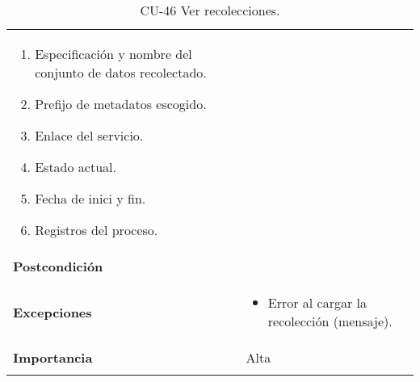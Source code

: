 \begin{longtable}[]{@{}ll@{}}
\begin{minipage}[t]{0.69\columnwidth}
\begin{enumerate}
  \begin{enumerate}
  \def\labelenumii{\alph{enumii}.}
  \tightlist
  \item
    Especificación y nombre del conjunto de datos recolectado.
  \item
    Prefijo de metadatos escogido.
  \item
    Enlace del servicio.
  \item
    Estado actual.
  \item
    Fecha de inici y fin.
  \item
    Registros del proceso.
  \end{enumerate}
\end{enumerate}\strut
\end{minipage}\tabularnewline
\begin{minipage}[t]{0.25\columnwidth}\raggedright
\textbf{Postcondición}\strut
\end{minipage} & \begin{minipage}[t]{0.69\columnwidth}\raggedright
\strut
\end{minipage}\tabularnewline
\begin{minipage}[t]{0.25\columnwidth}\raggedright
\textbf{Excepciones}\strut
\end{minipage} & \begin{minipage}[t]{0.69\columnwidth}\raggedright
\begin{itemize}
\tightlist
\item
  Error al cargar la recolección (mensaje).
\end{itemize}\strut
\end{minipage}\tabularnewline
\begin{minipage}[t]{0.25\columnwidth}\raggedright
\textbf{Importancia}\strut
\end{minipage} & \begin{minipage}[t]{0.69\columnwidth}\raggedright
Alta\strut
\end{minipage}\tabularnewline
\bottomrule
\caption{CU-46 Ver recolecciones.}
\end{longtable}

